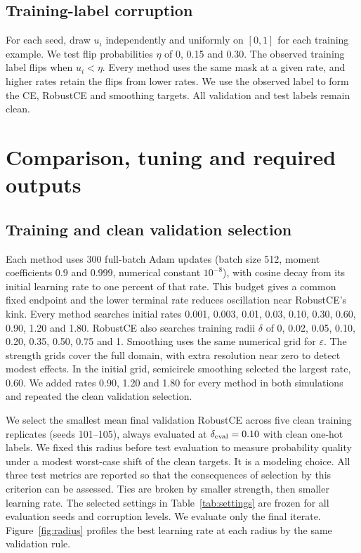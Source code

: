 \documentclass[11pt,a4paper]{article}
\begin{document}
\subsection{Training-label corruption}
For each seed, draw $u_i$ independently and uniformly on $[0,1]$ for
each training example. We test flip probabilities $\eta$ of 0, 0.15 and 0.30.
The observed training label flips when $u_i<\eta$. Every method uses the
same mask at a given rate, and higher rates retain the flips from lower
rates. We use the observed label to form the CE, RobustCE and smoothing
targets. All validation and test labels remain clean.

\section{Comparison, tuning and required outputs}
\label{sec:comparison}
\subsection{Training and clean validation selection}
Each method uses 300 full-batch Adam updates (batch size 512, moment
coefficients $0.9$ and $0.999$, numerical constant $10^{-8}$), with cosine
decay from its initial learning rate to one percent of that rate. This
budget gives a common fixed endpoint and the lower terminal rate reduces
oscillation near RobustCE's kink. Every method searches initial rates
0.001, 0.003, 0.01, 0.03, 0.10, 0.30, 0.60, 0.90, 1.20 and 1.80. RobustCE also searches
training radii $\delta$ of 0, 0.02, 0.05, 0.10, 0.20, 0.35, 0.50, 0.75 and 1.
Smoothing
uses the same numerical grid for $\varepsilon$. The strength grids cover
the full domain, with extra resolution near zero to detect modest effects.
In the initial grid, semicircle smoothing selected the largest rate, 0.60.
We added rates 0.90, 1.20 and 1.80 for every method in both simulations
and repeated the clean validation selection.

We select the smallest mean final validation RobustCE across five clean
training replicates (seeds 101--105), always evaluated at
$\delta_{\rm eval}=0.10$ with clean one-hot labels. We fixed this radius
before test evaluation to measure probability quality under a modest
worst-case shift of the clean targets. It is a modeling choice. All three
test metrics are reported so that the consequences of selection by this
criterion can be assessed. Ties are broken by smaller strength, then
smaller learning rate. The selected settings in Table~\ref{tab:settings}
are frozen for all evaluation seeds and corruption levels. We evaluate
only the final iterate. Figure~\ref{fig:radius} profiles the best learning
rate at each radius by the same validation rule.
\end{document}
